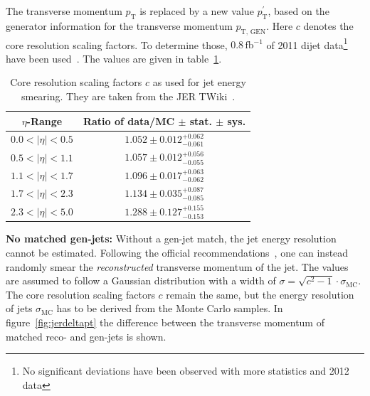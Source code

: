 \noindent The transverse momentum $p_{\text{T}}$ is replaced by a new value $p_{\text{T}}^\prime$, based on the generator information for the transverse momentum $p_{\text{T, GEN}}$. Here $c$ denotes the core resolution scaling factors. To determine those, $0.8\,\text{fb}^{-1}$ of 2011 dijet data\footnote{No significant deviations have been observed with more statistics and 2012 data} have been used~\cite{jer}. The values are given in table~\ref{tab:jerfactors}.

  \begin{table}[htbp!]
    \centering
    {\renewcommand{\arraystretch}{1.2}
      \begin{tabular}{|c|c|}
        \hline
        $\eta$-Range & Ratio of data/MC $\pm$ stat. $\pm$ sys. \\ \hline \hline
        $0.0 < |\eta| < 0.5$ & $1.052 \pm 0.012 ^{+0.062}_{-0.061}$ \\ \hline
        $0.5 < |\eta| < 1.1$ & $1.057 \pm 0.012 ^{+0.056}_{-0.055}$ \\ \hline
        $1.1 < |\eta| < 1.7$ & $1.096 \pm 0.017 ^{+0.063}_{-0.062}$ \\ \hline
        $1.7 < |\eta| < 2.3$ & $1.134 \pm 0.035 ^{+0.087}_{-0.085}$ \\ \hline
        $2.3 < |\eta| < 5.0$ & $1.288 \pm 0.127 ^{+0.155}_{-0.153}$ \\ \hline
      \end{tabular}
    }
    \caption{Core resolution scaling factors $c$ as used for jet energy smearing. They are taken from the JER TWiki~\cite{jer}.}
    \label{tab:jerfactors}
  \end{table}
  
\textbf{No matched gen-jets:} Without a gen-jet match, the jet energy resolution cannot be estimated. Following the official recommendations~\cite{jer}, one can instead randomly smear the \textit{reconstructed} transverse momentum of the jet. The values are assumed to follow a Gaussian distribution with a width of $\sigma = \sqrt{c^2-1} \cdot \sigma_{\text{MC}}$. The core resolution scaling factors $c$ remain the same, but the energy resolution of jets $\sigma_{\text{MC}}$ has to be derived from the Monte Carlo samples. In figure~\ref{fig:jerdeltapt} the difference between the transverse momentum of matched reco- and gen-jets is shown.

